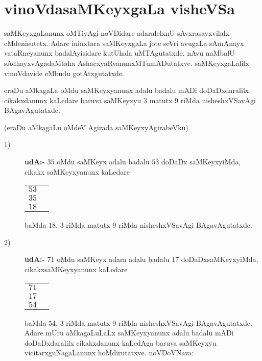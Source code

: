 \chapter{vinoVdasaMKeyxgaLa visheVSa}

saMKeyxgaLanunx oMTiyAgi noVDidare adaralelxnU sAvxrasayxvilalx eMdenisutetx. Adare ininxtara saMKeyxgaLa jote seVri avugaLa sAmAnayx vataRneyanunx badalAyisidare kutUhala uMTAgutatxde. nAvu naMbalU sAdhayxvAgadaMtaha AshacxyaRvanunxMTumADutatxve. saMKeyxgaLalilx vinoVdavide eMbudu gotAtxgutatxde.

eraDu aMkagaLa oMdu saMKeyxyanunx adalu badalu mADi doDaDxdaralilx cikakxdanunx kaLedare baruva saMKeyxyu $3$ matutx $9$ riMda nisheshxVSavAgi BAgavAgutatxde.

(eraDu aMkagaLu oMdeV Agirada saMKeyxyAgirabeVku)
\begin{description}
\item[{\rm 1)}] {\bf udA:-} $35$ oMdu saMKeyx adalu badalu $53$ doDaDx saMKeyxyiMda, cikakx saMKeyxyanunx kaLedare
  \begin{center}
\begin{tabular}{cc}
  $53$&\\
  $35$&\\\cline{1-1}
  $18$&
\end{tabular}
  \end{center}
  baMda $18$, $3$ riMda matutx $9$ riMda nisheshxVSavAgi BAgavAgutatxde.
  
\item[{\rm 2)}] {\bf udA:-} $71$ oMdu saMKeyx adara adalu badalu $17$ doDaDxsaMKeyxyiMda, cikakxsaMKeyxyanunx kaLedare
    \begin{center}
\begin{tabular}{cc}
  $71$&\\
  $17$&\\\cline{1-1}
  $54$&
\end{tabular}
  \end{center}

    baMda $54$, $3$ riMda matutx $9$ riMda nisheshxVSavAgi BAgavAgutatxde. Adare mUru aMkagaLuLaLx saMKeyxyanunx adalu badalu mADi doDaDxdaralilx cikakxdanunx kaLedAga baruva saMKeyxyu vicitarxguNagaLanunx hoMdirutatxve. noVDoVNava:
\end{description}


